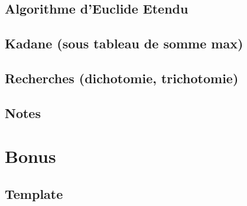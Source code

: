\documentclass[10pt]{article}
\begin{document}
\subsection{Algorithme d'Euclide Etendu}
{\scriptsize}

\subsection{Kadane (sous tableau de somme max)}
{\scriptsize}



\subsection{Recherches (dichotomie, trichotomie)}


\subsection{Notes}



\section{Bonus}
\subsection{Template}
{\scriptsize}
\end{document}
